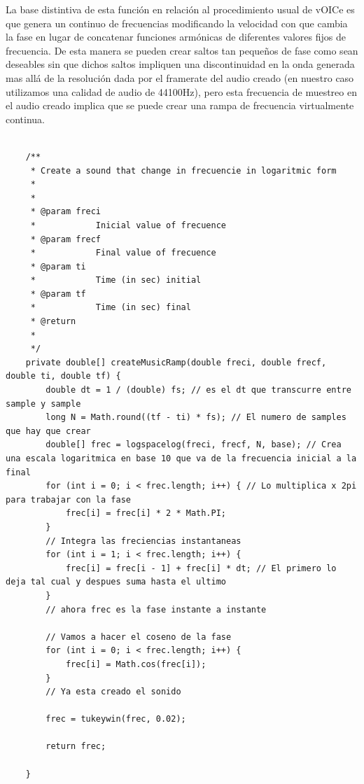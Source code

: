 \documentclass{article}
\begin{document}
    La base distintiva de esta función en relación al procedimiento usual de vOICe es que genera un continuo de frecuencias modificando la velocidad con que cambia la fase en lugar de concatenar funciones armónicas de diferentes valores fijos de frecuencia. De esta manera se pueden crear saltos tan pequeños de fase como sean deseables sin que dichos saltos impliquen una discontinuidad en la onda generada mas allá de la resolución dada por el framerate del audio creado (en nuestro caso utilizamos una calidad de audio de 44100Hz), pero esta frecuencia de muestreo en el audio creado implica que se puede crear una rampa de frecuencia virtualmente continua. 
    
    \begin{minipage}{\textwidth}
    \begin{lstlisting}[caption=Código que genera una rampa de frecuencia que varia en forma continua. Cada una de estas rampas es la representación sonora de un segmento en la lógica del vOICe pero preservando la continuidad de la señal al cambiar en forma continua la frecuencia como se observa en la figura \ref{fig:rampaFrec}., label=code:rampa]
    
    /**
	 * Create a sound that change in frecuencie in logaritmic form
	 * 
	 * 
	 * @param freci
	 *            Inicial value of frecuence
	 * @param frecf
	 *            Final value of frecuence
	 * @param ti
	 *            Time (in sec) initial
	 * @param tf
	 *            Time (in sec) final
	 * @return
	 * 
	 */
	private double[] createMusicRamp(double freci, double frecf, double ti, double tf) {
		double dt = 1 / (double) fs; // es el dt que transcurre entre sample y sample
		long N = Math.round((tf - ti) * fs); // El numero de samples que hay que crear
		double[] frec = logspacelog(freci, frecf, N, base); // Crea una escala logaritmica en base 10 que va de la frecuencia inicial a la final
		for (int i = 0; i < frec.length; i++) { // Lo multiplica x 2pi para trabajar con la fase
			frec[i] = frec[i] * 2 * Math.PI;
		}
		// Integra las freciencias instantaneas
		for (int i = 1; i < frec.length; i++) {
			frec[i] = frec[i - 1] + frec[i] * dt; // El primero lo deja tal cual y despues suma hasta el ultimo
		}
		// ahora frec es la fase instante a instante

		// Vamos a hacer el coseno de la fase
		for (int i = 0; i < frec.length; i++) {
			frec[i] = Math.cos(frec[i]);
		}
		// Ya esta creado el sonido

		frec = tukeywin(frec, 0.02);

		return frec;

	}
	\end{lstlisting}
    \end{minipage}
\end{document}
